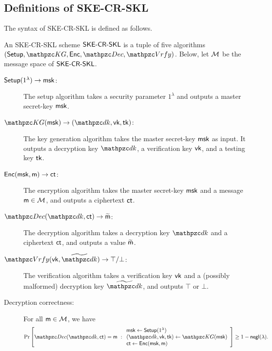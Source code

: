 \subsection{Definitions of SKE-CR-SKL}\label{def:ske_cr_skl}
The syntax of SKE-CR-SKL is defined as follows. 
\begin{definition}
    An SKE-CR-SKL scheme $\mathsf{SKE}\textrm{-}\mathsf{CR}\textrm{-}\mathsf{SKL}$ is a tuple of five algorithms
$(\Setup,\qKG, \Enc, \allowbreak \qDec, \qVrfy)$. 
Below, let $\mathcal{M}$  be the message space of $\mathsf{SKE}\textrm{-}\mathsf{CR}\textrm{-}\mathsf{SKL}$. 
\begin{description}
\item[$\mathsf{Setup}(1^\lambda)\rightarrow\mathsf{msk}$:] The setup algorithm takes a
security parameter $1^\lambda$ and outputs a master secret-key
$\mathsf{msk}$.

\item[$\qKG(\msk)\ra(\qdk,\vk,\tk)$:] The key generation algorithm
takes the master secret-key $\mathsf{msk}$ as input. It outputs a decryption
key $\qdk$, a verification key $\mathsf{vk}$, and a testing key
$\mathsf{tk}$.

\item[$\mathsf{Enc}(\mathsf{msk},\mathsf{m})\rightarrow\mathsf{ct}$:] The encryption algorithm takes the
master secret-key $\mathsf{msk}$ and a message $\mathsf{m} \in \mathcal{M}$, and outputs a
ciphertext $\mathsf{ct}$.

\item[$\qDec(\qdk,\ct)\ra\widetilde{\msg}$:] The decryption
algorithm takes a decryption key $\qdk$ and a ciphertext $\mathsf{ct}$,
and outputs a value $\widetilde{\mathsf{m}}$.


\item[$\qVrfy(\vk, \widetilde{\qdk})\ra\top/\bot$:] The verification
    algorithm takes a verification key $\mathsf{vk}$ and a (possibly
    malformed) decryption key $\widetilde{\qdk}$,
and outputs $\top$ or $\bot$.


\item[Decryption correctness:] For all $\mathsf{m} \in \mathcal{M}$, we have
\begin{align}
\Pr\left[
\qDec(\qdk, \ct) \allowbreak = \msg
\ :
\begin{array}{ll}
\msk\gets\Setup(1^\secp)\\
(\qdk,\vk,\tk)\gets\qKG(\msk)\\
\ct\gets\Enc(\msk,\msg)
\end{array}
\right] 
\ge 1-\negl(\secp).
\end{align}


\end{description}
\end{definition}
